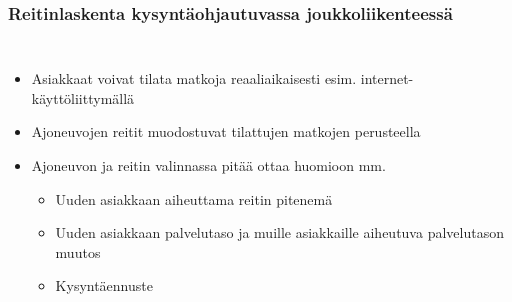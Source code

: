 \documentclass{beamer}
\begin{document}
\begin{frame}
  \frametitle{Reitinlaskenta kysyntäohjautuvassa joukkoliikenteessä}   %
  \begin{columns}[c]
  \column{3.5in}  %
  \begin{itemize}
    \item
    Asiakkaat voivat tilata matkoja reaaliaikaisesti esim. internet-käyttöliittymällä
    \item
    Ajoneuvojen reitit muodostuvat tilattujen matkojen perusteella
  \item
 Ajoneuvon ja reitin valinnassa pitää ottaa huomioon mm.
 \begin{itemize}
  \item 
  Uuden asiakkaan aiheuttama reitin pitenemä
  \item
  Uuden asiakkaan palvelutaso ja muille asiakkaille aiheutuva palvelutason muutos
  \item
  Kysyntäennuste
 \end{itemize}

  \end{itemize}
    \column{1.5in}
\centering


\end{columns}
\end{frame}
\end{document}
